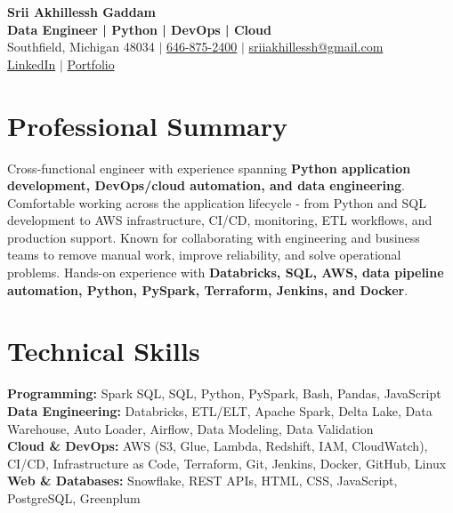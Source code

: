 \documentclass[letterpaper,10pt]{article}
\begin{document}
\fontsize{9.35pt}{10.45pt}\selectfont

\begin{center}
    {\LARGE \textbf{Srii Akhillessh Gaddam}} \\[-1pt]
    \textbf{Data Engineer | Python | DevOps | Cloud} \\[2pt]
    Southfield, Michigan 48034 $|$
    \href{tel:6468752400}{646-875-2400} $|$
    \href{mailto:sriiakhillessh@gmail.com}{sriiakhillessh@gmail.com} \\[1pt]
    \href{https://www.linkedin.com/in/srii-akhiilessh-gaddam-b48668191/}{LinkedIn} $|$
    \href{https://sriiakhillesshg.github.io/portfolio/}{Portfolio}
\end{center}
\vspace{-8pt}

\section{Professional Summary}
\small{Cross-functional engineer with experience spanning \textbf{Python application development, DevOps/cloud automation, and data engineering}. Comfortable working across the application lifecycle - from Python and SQL development to AWS infrastructure, CI/CD, monitoring, ETL workflows, and production support. Known for collaborating with engineering and business teams to remove manual work, improve reliability, and solve operational problems. Hands-on experience with \textbf{Databricks, SQL, AWS, data pipeline automation, Python, PySpark, Terraform, Jenkins, and Docker}.}

\section{Technical Skills}
\small{
\textbf{Programming:} Spark SQL, SQL, Python, PySpark, Bash, Pandas, JavaScript \\
\textbf{Data Engineering:} Databricks, ETL/ELT, Apache Spark, Delta Lake, Data Warehouse, Auto Loader, Airflow, Data Modeling, Data Validation \\
\textbf{Cloud \& DevOps:} AWS (S3, Glue, Lambda, Redshift, IAM, CloudWatch), CI/CD, Infrastructure as Code, Terraform, Git, Jenkins, Docker, GitHub, Linux \\
\textbf{Web \& Databases:} Snowflake, REST APIs, HTML, CSS, JavaScript, PostgreSQL, Greenplum
}
\end{document}
